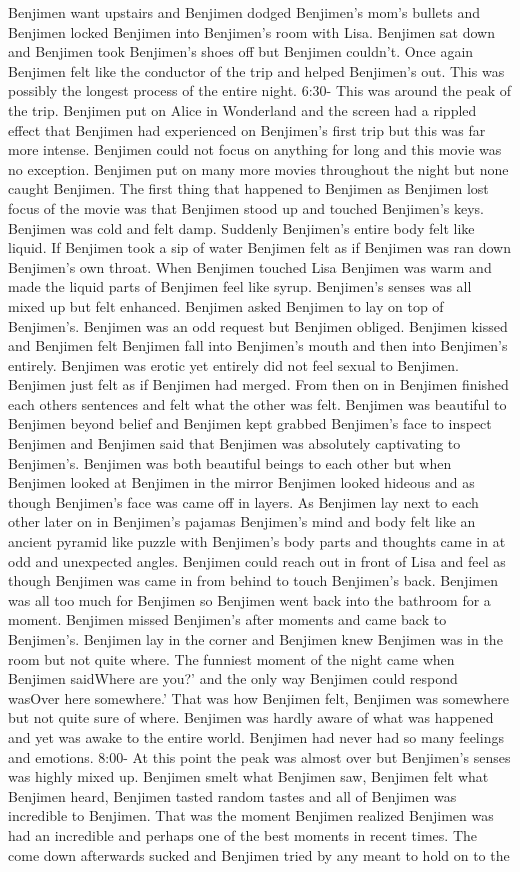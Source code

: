 \documentclass[12pt]{book}
\begin{document}
Benjimen want upstairs and Benjimen dodged Benjimen's mom's bullets and Benjimen locked Benjimen into Benjimen's room with Lisa. Benjimen sat down and Benjimen took Benjimen's shoes off but Benjimen couldn't. Once again Benjimen felt like the conductor of the trip and helped Benjimen's out. This was possibly the longest process of the entire night. 6:30- This was around the peak of the trip. Benjimen put on Alice in Wonderland and the screen had a rippled effect that Benjimen had experienced on Benjimen's first trip but this was far more intense. Benjimen could not focus on anything for long and this movie was no exception. Benjimen put on many more movies throughout the night but none caught Benjimen. The first thing that happened to Benjimen as Benjimen lost focus of the movie was that Benjimen stood up and touched Benjimen's keys. Benjimen was cold and felt damp. Suddenly Benjimen's entire body felt like liquid. If Benjimen took a sip of water Benjimen felt as if Benjimen was ran down Benjimen's own throat. When Benjimen touched Lisa Benjimen was warm and made the liquid parts of Benjimen feel like syrup. Benjimen's senses was all mixed up but felt enhanced. Benjimen asked Benjimen to lay on top of Benjimen's. Benjimen was an odd request but Benjimen obliged. Benjimen kissed and Benjimen felt Benjimen fall into Benjimen's mouth and then into Benjimen's entirely. Benjimen was erotic yet entirely did not feel sexual to Benjimen. Benjimen just felt as if Benjimen had merged. From then on in Benjimen finished each others sentences and felt what the other was felt. Benjimen was beautiful to Benjimen beyond belief and Benjimen kept grabbed Benjimen's face to inspect Benjimen and Benjimen said that Benjimen was absolutely captivating to Benjimen's. Benjimen was both beautiful beings to each other but when Benjimen looked at Benjimen in the mirror Benjimen looked hideous and as though Benjimen's face was came off in layers. As Benjimen lay next to each other later on in Benjimen's pajamas Benjimen's mind and body felt like an ancient pyramid like puzzle with Benjimen's body parts and thoughts came in at odd and unexpected angles. Benjimen could reach out in front of Lisa and feel as though Benjimen was came in from behind to touch Benjimen's back. Benjimen was all too much for Benjimen so Benjimen went back into the bathroom for a moment. Benjimen missed Benjimen's after moments and came back to Benjimen's. Benjimen lay in the corner and Benjimen knew Benjimen was in the room but not quite where. The funniest moment of the night came when Benjimen saidWhere are you?' and the only way Benjimen could respond wasOver here somewhere.' That was how Benjimen felt, Benjimen was somewhere but not quite sure of where. Benjimen was hardly aware of what was happened and yet was awake to the entire world. Benjimen had never had so many feelings and emotions. 8:00- At this point the peak was almost over but Benjimen's senses was highly mixed up. Benjimen smelt what Benjimen saw, Benjimen felt what Benjimen heard, Benjimen tasted random tastes and all of Benjimen was incredible to Benjimen. That was the moment Benjimen realized Benjimen was had an incredible and perhaps one of the best moments in recent times. The come down afterwards sucked and Benjimen tried by any meant to hold on to the 
\end{document}
